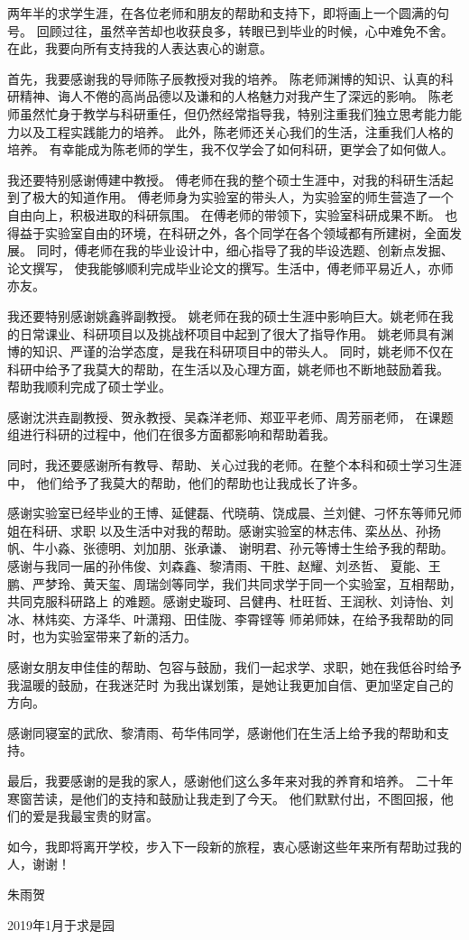 \begin{thanks}
两年半的求学生涯，在各位老师和朋友的帮助和支持下，即将画上一个圆满的句号。
回顾过往，虽然辛苦却也收获良多，转眼已到毕业的时候，心中难免不舍。
在此，我要向所有支持我的人表达衷心的谢意。

首先，我要感谢我的导师陈子辰教授对我的培养。
陈老师渊博的知识、认真的科研精神、诲人不倦的高尚品德以及谦和的人格魅力对我产生了深远的影响。
陈老师虽然忙身于教学与科研重任，但仍然经常指导我，特别注重我们独立思考能力能力以及工程实践能力的培养。
此外，陈老师还关心我们的生活，注重我们人格的培养。
有幸能成为陈老师的学生，我不仅学会了如何科研，更学会了如何做人。

我还要特别感谢傅建中教授。
傅老师在我的整个硕士生涯中，对我的科研生活起到了极大的知道作用。
傅老师身为实验室的带头人，为实验室的师生营造了一个自由向上，积极进取的科研氛围。
在傅老师的带领下，实验室科研成果不断。
也得益于实验室自由的环境，在科研之外，各个同学在各个领域都有所建树，全面发展。
同时，傅老师在我的毕业设计中，细心指导了我的毕设选题、创新点发掘、论文撰写，
使我能够顺利完成毕业论文的撰写。生活中，傅老师平易近人，亦师亦友。

我还要特别感谢姚鑫骅副教授。
姚老师在我的硕士生涯中影响巨大。姚老师在我的日常课业、科研项目以及挑战杯项目中起到了很大了指导作用。
姚老师具有渊博的知识、严谨的治学态度，是我在科研项目中的带头人。
同时，姚老师不仅在科研中给予了我莫大的帮助，在生活以及心理方面，姚老师也不断地鼓励着我。
帮助我顺利完成了硕士学业。

感谢沈洪垚副教授、贺永教授、吴森洋老师、郑亚平老师、周芳丽老师，
在课题组进行科研的过程中，他们在很多方面都影响和帮助着我。

同时，我还要感谢所有教导、帮助、关心过我的老师。在整个本科和硕士学习生涯中，
他们给予了我莫大的帮助，他们的帮助也让我成长了许多。

感谢实验室已经毕业的王博、延健磊、代晓萌、饶成晨、兰刘健、刁怀东等师兄师姐在科研、求职
以及生活中对我的帮助。感谢实验室的林志伟、栾丛丛、孙扬帆、牛小淼、张德明、刘加朋、张承谦、
谢明君、孙元等博士生给予我的帮助。感谢与我同一届的孙伟俊、刘森鑫、黎清雨、干胜、赵耀、刘丞哲、
夏能、王鹏、严梦玲、黄天玺、周瑞剑等同学，我们共同求学于同一个实验室，互相帮助，共同克服科研路上
的难题。感谢史璇珂、吕健冉、杜旺哲、王润秋、刘诗怡、刘冰、林炜奕、方泽华、叶潇翔、田佳陇、李霄铿等
师弟师妹，在给予我帮助的同时，也为实验室带来了新的活力。

感谢女朋友申佳佳的帮助、包容与鼓励，我们一起求学、求职，她在我低谷时给予我温暖的鼓励，在我迷茫时
为我出谋划策，是她让我更加自信、更加坚定自己的方向。

感谢同寝室的武欣、黎清雨、苟华伟同学，感谢他们在生活上给予我的帮助和支持。

最后，我要感谢的是我的家人，感谢他们这么多年来对我的养育和培养。
二十年寒窗苦读，是他们的支持和鼓励让我走到了今天。
他们默默付出，不图回报，他们的爱是我最宝贵的财富。

如今，我即将离开学校，步入下一段新的旅程，衷心感谢这些年来所有帮助过我的人，谢谢！

\hfill 朱雨贺

\hfill 2019年1月于求是园

\end{thanks}
